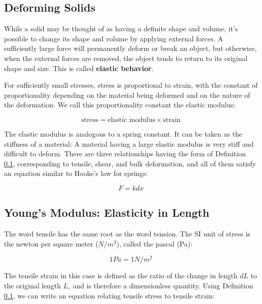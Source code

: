 \subsection{Deforming Solids}\label{deformingsolids}
While a solid may be thought of as having a definite shape and volume, it's possible to change its shape and volume by applying external forces. A sufficiently large force will permanently deform or break an object, but otherwise, when the external forces are removed, the object tends to return to its original shape and size. This is called \textbf{elastic behavior}.

For sufficiently small stresses, stress is proportional to strain, with the constant of proportionality depending on the material being deformed and on the nature of the deformation. We call this proportionality constant the elastic modulus:
\begin{defi}
$$\text{stress} = \text{elastic modulus} \times \text{strain}$$
\end{defi}

The elastic modulus is analogous to a spring constant. It can be taken as the stiffness of a material: A material having a large elastic modulus is very stiff and difficult to deform. There are three relationships having the form of Definition \ref{deformingsolids}, corresponding to tensile, shear, and bulk deformation, and all of them satisfy an equation similar to Hooke's law for springs:

\begin{form}
$$F=kd x$$
\end{form}

\subsection{Young's Modulus: Elasticity in Length}

The word tensile has the same root as the word tension. The SI unit of stress is the newton per square meter ($N/m^2$), called the pascal (Pa):

\begin{defi}[Pascal]
$$1 Pa = 1N/m^2$$
\end{defi}

The tensile strain in this case is defined as the ratio of the change in length $d L$ to the original length $L_\circ$ and is therefore a dimensionless quantity. Using Definition \ref{deformingsolids}, we can write an equation relating tensile stress to tensile strain:

